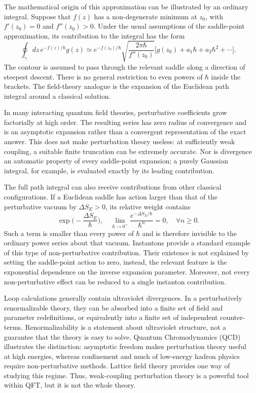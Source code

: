The mathematical origin of this approximation can be illustrated by an ordinary integral. Suppose that $f(z)$ has a non-degenerate minimum at $z_0$, with $f'(z_0) = 0$ and $f''(z_0) > 0$. Under the usual assumptions of the saddle-point approximation, its contribution to the integral has the form
\begin{equation}
    \oint_\gamma dz\,e^{-f(z)/\hbar}g(z)
    \simeq e^{-f(z_0)/\hbar}
    \sqrt{\frac{2\pi\hbar}{f''(z_0)}}
    \bigg[g(z_0) + a_1\hbar + a_2\hbar^2 + \cdots\bigg].
\end{equation}
The contour is assumed to pass through the relevant saddle along a direction of steepest descent. There is no general restriction to even powers of $\hbar$ inside the brackets. The field-theory analogue is the expansion of the Euclidean path integral around a classical solution.

In many interacting quantum field theories, perturbative coefficients grow factorially at high order. The resulting series has zero radius of convergence and is an asymptotic expansion rather than a convergent representation of the exact answer. This does not make perturbation theory useless: at sufficiently weak coupling, a suitable finite truncation can be extremely accurate. Nor is divergence an automatic property of every saddle-point expansion; a purely Gaussian integral, for example, is evaluated exactly by its leading contribution.

The full path integral can also receive contributions from other classical configurations. If a Euclidean saddle has action larger than that of the perturbative vacuum by $\Delta S_E > 0$, its relative weight contains
\begin{equation}
    \exp\bigg(-\frac{\Delta S_E}{\hbar}\bigg),\quad \lim_{\hbar\to0^+}\frac{e^{-\Delta S_E/\hbar}}{\hbar^n} = 0,\quad \forall n\ge0.
\end{equation}
Such a term is smaller than every power of $\hbar$ and is therefore invisible to the ordinary power series about that vacuum. Instantons provide a standard example of this type of non-perturbative contribution. Their existence is not explained by setting the saddle-point action to zero, instead, the relevant feature is the exponential dependence on the inverse expansion parameter. Moreover, not every non-perturbative effect can be reduced to a single instanton contribution.

Loop calculations generally contain ultraviolet divergences. In a perturbatively renormalizable theory, they can be absorbed into a finite set of field and parameter redefinitions, or equivalently into a finite set of independent counter-terms. Renormalizability is a statement about ultraviolet structure, not a guarantee that the theory is easy to solve. Quantum Chromodynamics (QCD) illustrates the distinction: asymptotic freedom makes perturbation theory useful at high energies, whereas confinement and much of low-energy hadron physics require non-perturbative methods. Lattice field theory provides one way of studying this regime. Thus, weak-coupling perturbation theory is a powerful tool within QFT, but it is not the whole theory.

